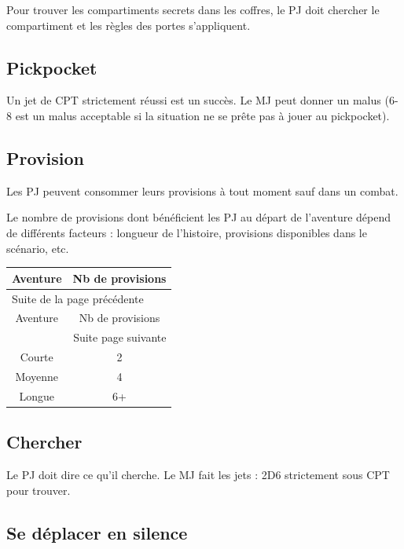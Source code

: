 \documentclass[a4paper, 11pt, twoside]{article}
\begin{document}
Pour trouver les compartiments secrets dans les coffres, le PJ doit chercher le compartiment et les règles des portes s'appliquent.

\subsection{Pickpocket}
\label{sec:org7bba3e8}

Un jet de CPT strictement réussi est un succès. Le MJ peut donner un malus (6-8 est un malus acceptable si la situation ne se prête pas à jouer au pickpocket).

\subsection{Provision}
\label{sec:orge512807}

Les PJ peuvent consommer leurs provisions à tout moment sauf dans un combat.

Le nombre de provisions dont bénéficient les PJ au départ de l'aventure dépend de différents facteurs : longueur de l'histoire, provisions disponibles dans le scénario, etc.

\begin{longtable}{c|c}
Aventure & Nb de provisions\\
\hline
\endfirsthead
\multicolumn{2}{l}{Suite de la page précédente} \\
\hline

Aventure & Nb de provisions \\

\hline
\endhead
\hline\multicolumn{2}{r}{Suite page suivante} \\
\endfoot
\endlastfoot
\hline
Courte & 2\\
Moyenne & 4\\
Longue & 6+\\
\end{longtable}

\subsection{Chercher}
\label{sec:orgf07601a}

Le PJ doit dire ce qu'il cherche. Le MJ fait les jets : 2D6 strictement sous CPT pour trouver.

\subsection{Se déplacer en silence}
\label{sec:org69deb4b}
\end{document}
